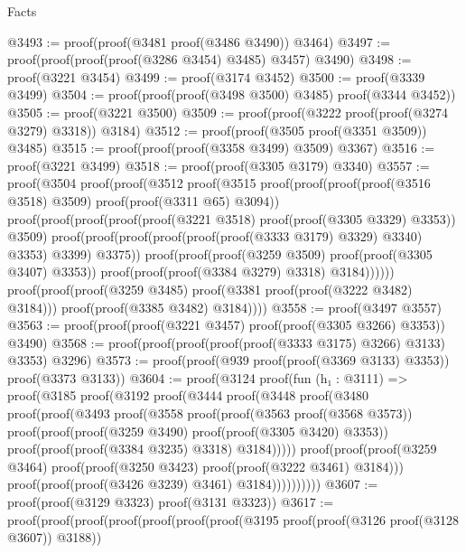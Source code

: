 \begin{lexlean}{Facts}
\begin{coremodule}
@3493 := proof(proof(@3481 proof(@3486 @3490)) @3464)
@3497 := proof(proof(proof(proof(@3286 @3454) @3485) @3457) @3490)
@3498 := proof(@3221 @3454)
@3499 := proof(@3174 @3452)
@3500 := proof(@3339 @3499)
@3504 := proof(proof(proof(@3498 @3500) @3485) proof(@3344 @3452))
@3505 := proof(@3221 @3500)
@3509 := proof(proof(@3222 proof(proof(@3274 @3279) @3318)) @3184)
@3512 := proof(proof(@3505 proof(@3351 @3509)) @3485)
@3515 := proof(proof(proof(@3358 @3499) @3509) @3367)
@3516 := proof(@3221 @3499)
@3518 := proof(proof(@3305 @3179) @3340)
@3557 := proof(@3504
      proof(proof(@3512
            proof(@3515
                proof(proof(proof(proof(@3516 @3518) @3509) proof(proof(@3311 @65) @3094))
                    proof(proof(proof(proof(proof(@3221 @3518) proof(proof(@3305 @3329) @3353))
                            @3509)
                          proof(proof(proof(proof(proof(proof(@3333 @3179) @3329) @3340) @3353)
                                @3399)
                              @3375))
                        proof(proof(proof(@3259 @3509) proof(proof(@3305 @3407) @3353))
                            proof(proof(proof(@3384 @3279) @3318) @3184))))))
          proof(proof(proof(@3259 @3485) proof(@3381 proof(proof(@3222 @3482) @3184)))
              proof(proof(@3385 @3482) @3184))))
@3558 := proof(@3497 @3557)
@3563 := proof(proof(proof(@3221 @3457) proof(proof(@3305 @3266) @3353)) @3490)
@3568 := proof(proof(proof(proof(proof(@3333 @3175) @3266) @3133) @3353) @3296)
@3573 := proof(proof(@939 proof(proof(@3369 @3133) @3353)) proof(@3373 @3133))
@3604 := proof(@3124
      proof(fun (h₁ : @3111) =>
        proof(@3185
            proof(@3192
                proof(@3444
                    proof(@3448
                        proof(@3480
                            proof(proof(@3493
                                  proof(@3558
                                      proof(proof(@3563 proof(@3568 @3573))
                                          proof(proof(proof(@3259 @3490)
                                                proof(proof(@3305 @3420) @3353))
                                              proof(proof(proof(@3384 @3235) @3318) @3184)))))
                                proof(proof(proof(@3259 @3464)
                                      proof(proof(@3250 @3423) proof(proof(@3222 @3461) @3184)))
                                    proof(proof(proof(@3426 @3239) @3461) @3184))))))))))
@3607 := proof(proof(@3129 @3323) proof(@3131 @3323))
@3617 := proof(proof(proof(proof(proof(proof(proof(@3195
                  proof(proof(@3126 proof(@3128 @3607)) @3188))

\end{coremodule}
\end{lexlean}
